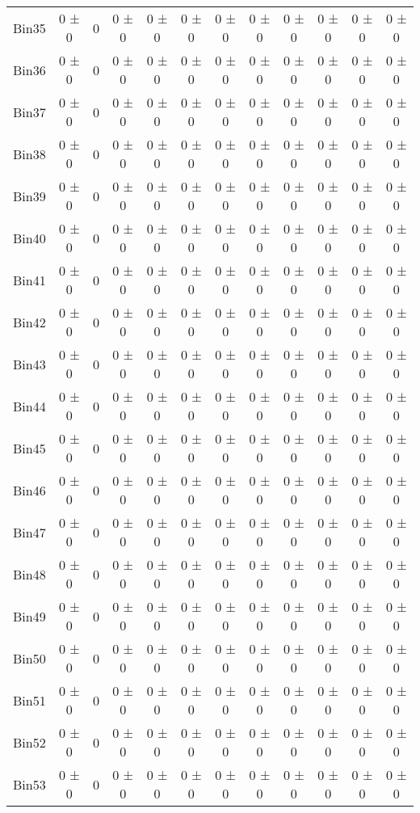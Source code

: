 \begin{tabular}{@{\extracolsep{4pt}}lccccccccccc@{}}
     Bin35 & 0 ± 0 & 0 & 0 ± 0 & 0 ± 0 & 0 ± 0 & 0 ± 0 & 0 ± 0 & 0 ± 0 & 0 ± 0 & 0 ± 0 & 0 ± 0 \\ 
     Bin36 & 0 ± 0 & 0 & 0 ± 0 & 0 ± 0 & 0 ± 0 & 0 ± 0 & 0 ± 0 & 0 ± 0 & 0 ± 0 & 0 ± 0 & 0 ± 0 \\ 
     Bin37 & 0 ± 0 & 0 & 0 ± 0 & 0 ± 0 & 0 ± 0 & 0 ± 0 & 0 ± 0 & 0 ± 0 & 0 ± 0 & 0 ± 0 & 0 ± 0 \\ 
     Bin38 & 0 ± 0 & 0 & 0 ± 0 & 0 ± 0 & 0 ± 0 & 0 ± 0 & 0 ± 0 & 0 ± 0 & 0 ± 0 & 0 ± 0 & 0 ± 0 \\ 
     Bin39 & 0 ± 0 & 0 & 0 ± 0 & 0 ± 0 & 0 ± 0 & 0 ± 0 & 0 ± 0 & 0 ± 0 & 0 ± 0 & 0 ± 0 & 0 ± 0 \\ 
     Bin40 & 0 ± 0 & 0 & 0 ± 0 & 0 ± 0 & 0 ± 0 & 0 ± 0 & 0 ± 0 & 0 ± 0 & 0 ± 0 & 0 ± 0 & 0 ± 0 \\ 
     Bin41 & 0 ± 0 & 0 & 0 ± 0 & 0 ± 0 & 0 ± 0 & 0 ± 0 & 0 ± 0 & 0 ± 0 & 0 ± 0 & 0 ± 0 & 0 ± 0 \\ 
     Bin42 & 0 ± 0 & 0 & 0 ± 0 & 0 ± 0 & 0 ± 0 & 0 ± 0 & 0 ± 0 & 0 ± 0 & 0 ± 0 & 0 ± 0 & 0 ± 0 \\ 
     Bin43 & 0 ± 0 & 0 & 0 ± 0 & 0 ± 0 & 0 ± 0 & 0 ± 0 & 0 ± 0 & 0 ± 0 & 0 ± 0 & 0 ± 0 & 0 ± 0 \\ 
     Bin44 & 0 ± 0 & 0 & 0 ± 0 & 0 ± 0 & 0 ± 0 & 0 ± 0 & 0 ± 0 & 0 ± 0 & 0 ± 0 & 0 ± 0 & 0 ± 0 \\ 
     Bin45 & 0 ± 0 & 0 & 0 ± 0 & 0 ± 0 & 0 ± 0 & 0 ± 0 & 0 ± 0 & 0 ± 0 & 0 ± 0 & 0 ± 0 & 0 ± 0 \\ 
     Bin46 & 0 ± 0 & 0 & 0 ± 0 & 0 ± 0 & 0 ± 0 & 0 ± 0 & 0 ± 0 & 0 ± 0 & 0 ± 0 & 0 ± 0 & 0 ± 0 \\ 
     Bin47 & 0 ± 0 & 0 & 0 ± 0 & 0 ± 0 & 0 ± 0 & 0 ± 0 & 0 ± 0 & 0 ± 0 & 0 ± 0 & 0 ± 0 & 0 ± 0 \\ 
     Bin48 & 0 ± 0 & 0 & 0 ± 0 & 0 ± 0 & 0 ± 0 & 0 ± 0 & 0 ± 0 & 0 ± 0 & 0 ± 0 & 0 ± 0 & 0 ± 0 \\ 
     Bin49 & 0 ± 0 & 0 & 0 ± 0 & 0 ± 0 & 0 ± 0 & 0 ± 0 & 0 ± 0 & 0 ± 0 & 0 ± 0 & 0 ± 0 & 0 ± 0 \\ 
     Bin50 & 0 ± 0 & 0 & 0 ± 0 & 0 ± 0 & 0 ± 0 & 0 ± 0 & 0 ± 0 & 0 ± 0 & 0 ± 0 & 0 ± 0 & 0 ± 0 \\ 
     Bin51 & 0 ± 0 & 0 & 0 ± 0 & 0 ± 0 & 0 ± 0 & 0 ± 0 & 0 ± 0 & 0 ± 0 & 0 ± 0 & 0 ± 0 & 0 ± 0 \\ 
     Bin52 & 0 ± 0 & 0 & 0 ± 0 & 0 ± 0 & 0 ± 0 & 0 ± 0 & 0 ± 0 & 0 ± 0 & 0 ± 0 & 0 ± 0 & 0 ± 0 \\ 
     Bin53 & 0 ± 0 & 0 & 0 ± 0 & 0 ± 0 & 0 ± 0 & 0 ± 0 & 0 ± 0 & 0 ± 0 & 0 ± 0 & 0 ± 0 & 0 ± 0 \\ 

\end{tabular}
